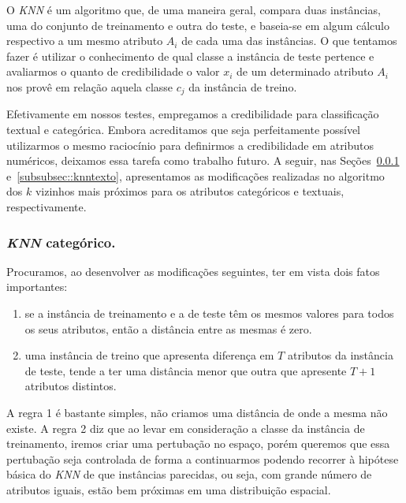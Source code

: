 O \textit{KNN} é um algoritmo que, de uma maneira geral, compara duas instâncias, uma do conjunto de treinamento e outra do teste, e baseia-se em algum cálculo respectivo a um mesmo atributo $A_i$ de cada uma das instâncias. O que tentamos fazer é utilizar o conhecimento de qual classe a instância de teste pertence e avaliarmos o quanto de credibilidade o valor $x_i$ de um determinado atributo $A_i$ nos provê em relação aquela classe $c_j$ da instância de treino.

Efetivamente em nossos testes, empregamos a credibilidade para classificação textual e categórica. Embora acreditamos que seja perfeitamente possível utilizarmos o mesmo raciocínio para definirmos a credibilidade em atributos numéricos, deixamos essa tarefa como trabalho futuro. A seguir, nas Seções~\ref{subsubsec::knncat} e~\ref{subsubsec::knntexto}, apresentamos as modificações realizadas no algoritmo dos $k$ vizinhos mais próximos para os atributos categóricos e textuais, respectivamente.

\subsubsection{\textit{KNN} categórico.}
\label{subsubsec::knncat}

Procuramos, ao desenvolver as modificações seguintes, ter em vista dois fatos importantes:
\begin{enumerate}
\item se a instância de treinamento e a de teste têm os mesmos valores para todos os seus atributos, então a distância entre as mesmas é zero. 
\item uma instância de treino que apresenta diferença em $T$ atributos da instância de teste, tende a ter uma distância menor que outra que apresente $T+1$ atributos distintos.
\end{enumerate}

A regra 1 é bastante simples, não criamos uma distância de onde a mesma não existe. A regra 2 diz que ao levar em consideração a classe da instância de treinamento, iremos criar uma pertubação no espaço, porém queremos que essa pertubação seja controlada de forma a continuarmos podendo recorrer à hipótese básica do \textit{KNN} de que instâncias parecidas, ou seja, com grande número de atributos iguais, estão bem próximas em uma distribuição espacial.

